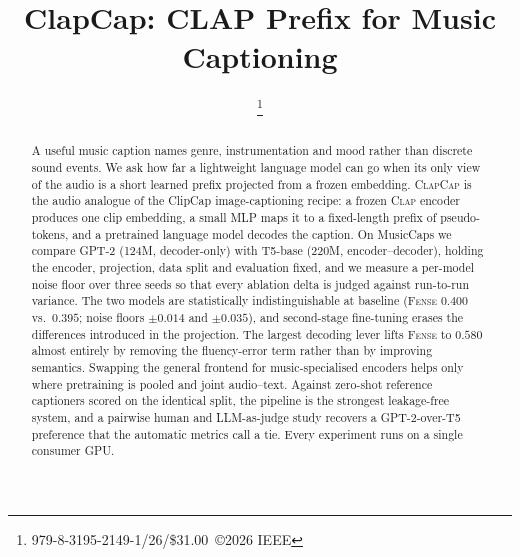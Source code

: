 \documentclass[conference]{IEEEtran}
\newcommand{\fense}{\textsc{Fense}}
\newcommand{\clapenc}{\textsc{Clap}}
\newcommand{\sys}{\textsc{ClapCap}}
\begin{document}
\title{ClapCap: CLAP Prefix for Music Captioning}

\author{
\and
{}
\thanks{979-8-3195-2149-1/26/\$31.00~\copyright2026 IEEE}}

\maketitle

\begin{abstract}
A useful music caption names genre, instrumentation and mood rather than discrete sound events.
We ask how far a lightweight language model can go when its only view of the audio is a short
learned prefix projected from a frozen embedding. \sys{} is the audio analogue of the ClipCap
image-captioning recipe: a frozen \clapenc{} encoder produces one clip embedding, a small MLP
maps it to a fixed-length prefix of pseudo-tokens, and a pretrained language model decodes the
caption. On MusicCaps we compare GPT-2 (124M, decoder-only) with T5-base (220M,
encoder--decoder), holding the encoder, projection, data split and evaluation fixed, and we
measure a per-model noise floor over three seeds so that every ablation delta is judged against
run-to-run variance. The two models are statistically indistinguishable at baseline
(\fense{} $0.400$ vs.\ $0.395$; noise floors $\pm0.014$ and $\pm0.035$), and second-stage
fine-tuning erases the differences introduced in the projection. The largest decoding lever
lifts \fense{} to $0.580$ almost entirely by removing the fluency-error term rather than by
improving semantics. Swapping the general frontend for music-specialised encoders helps only
where pretraining is pooled and joint audio--text. Against zero-shot reference captioners scored
on the identical split, the pipeline is the strongest leakage-free system, and a pairwise human
and LLM-as-judge study recovers a GPT-2-over-T5 preference that the automatic metrics call a
tie. Every experiment runs on a single consumer GPU.
\end{abstract}
\end{document}
